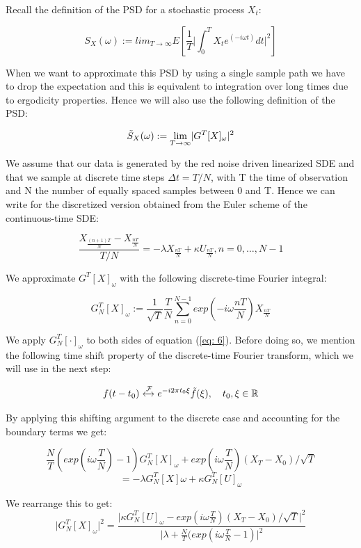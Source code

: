 \documentclass[%
thesis=student,%
coverpage=false,%
titlepage=false,%
headmarks=true, %
english,%
font=libertine, %
math=newpxtx, %
BCOR=5mm,%
coverBCOR=11mm%
]{tumbook}
\begin{document}
Recall the definition of the PSD for a stochastic process $X_{t}$:

\[
S_{X}(\omega) := lim_{T\rightarrow\infty}E[\frac{1}{T}\lvert\int_{0}^{T}X_{t}e^{(-i\omega t)}dt \rvert^{2}]
\]

When we want to approximate this PSD by using a single sample path we have to drop the expectation and this is equivalent to integration over long times due to ergodicity properties. Hence we will also use the following definition of the PSD:

\[
    \Tilde{S}_{X}(\omega) := \lim_{T\rightarrow\infty} \lvert G^{T}[X]_{\omega}\rvert ^2
\]


We assume that our data is generated by the red noise driven linearized SDE and that we sample at discrete time steps $\Delta t = T/N$, with T the time of observation and N the number of equally spaced samples between 0 and T. Hence we can write for the discretized version obtained from the Euler scheme of the continuous-time SDE:

        \begin{equation}  
        \frac{X_{\frac{(n+1)T}{N}}-X_{\frac{nT}{N}}}{T/N} = -\lambda X_{\frac{nT}{N}} + \kappa U_{\frac{nT}{N}}, n = 0, \dots, N-1 \label{eq: 6}
        \end{equation}


We approximate $G^{T}[X]_{\omega}$ with the following discrete-time Fourier integral:

    \[
    G_{N}^{T}[X]_{\omega}:= \frac{1}{\sqrt{T}}\frac{T}{N}\sum_{n=0}^{N-1}exp(-i\omega\frac{nT}{N})X_{\frac{nT}{N}}
    \]


We apply $G_{N}^{T}[\cdot]_{\omega}$ to both sides of equation (\ref{eq: 6}). Before doing so, we mention the following time shift property of the discrete-time Fourier transform, which we will use in the next step:

\[
f(t-t_{0}) \xleftrightarrow{\mathcal{F}} e^{-i2\pi t_{0}\xi}\Tilde{f}(\xi), \ \ \ t_{0},\xi \in \mathbb{R}
\]

By applying this shifting argument to the discrete case and accounting for the boundary terms we get: 
        
    \[
    \frac{N}{T}(exp(i\omega\frac{T}{N})-1)G_{N}^{T}[X]_{\omega} + exp(i\omega\frac{T}{N})(X_{T}-X_{0})/\sqrt{T} 
    \]
    \[
    = -\lambda G_{N}^{T}[X]\omega + \kappa G_{N}^{T}[U]_{\omega}
    \]


We rearrange this to get:
    \[
    \lvert G_{N}^{T}[X]_{\omega}\rvert ^2 = \frac{\lvert \kappa G_{N}^{T}[U]_{\omega} - exp(i\omega\frac{T}{N})(X_{T}-X_{0})/\sqrt{T}\rvert ^2}{\lvert \lambda + \frac{N}{T}(exp(i\omega\frac{T}{N} - 1)\rvert^2}
    \]
\end{document}
